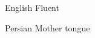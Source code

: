 
\begin{cvskills}

  \cvskill
    {English} %
    {}
    {Fluent} %

  \cvskill
    {Persian} %
    {}
    {Mother tongue} %
\end{cvskills}
